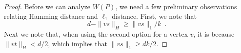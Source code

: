 \documentclass[lotsofwhite]{patmorin}
\begin{document}
\begin{proof}
Before we can analyze
$W(P)$, we need a few preliminary observations relating Hamming distance and $\ell_1$ distance.  First, we note that
\begin{equation}
   d-\|vs\|_H \ge \|vs\|_1/k \enspace .
\end{equation}
Next we note that, when using the second option for a vertex $v$, it is because $\|vt\|_H < d/2$, which implies that $\|vs\|_1 \ge dk/2$.
\end{proof}
\end{document}
